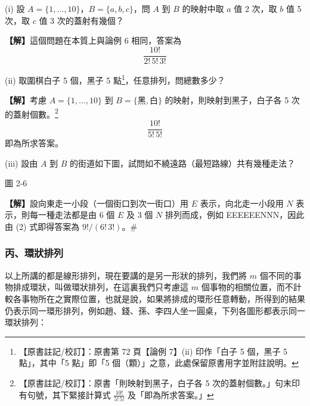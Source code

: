 \begin{discussion}\label{disc:b5-2-7}
(i) 設 $A = \{1, \dots, 10\}$，$B = \{a, b, c\}$，問 $A$ 到 $B$ 的映射中取 $a$ 值 2 次，取 $b$ 值 5 次，取 $c$ 值 3 次的蓋射有幾個？
\par\smallskip\noindent\textbf{【解】}\quad 這個問題在本質上與論例 6 相同，答案為
\[
\frac{10!}{2! \, 5! \, 3!}
\]

\indent(ii) 取圍棋白子 5 個，黑子 5 點\label{note:b5-ch2-p72-go-stones}\footnote{【原書註記/校訂】：原書第 72 頁【論例 7】(ii) 印作「白子 5 個，黑子 5 點」，其中「5 點」即「5 個（顆）」之意，此處保留原書用字並附註說明。}，任意排列，問總數多少？
\par\smallskip\noindent\textbf{【解】}\quad 考慮 $A = \{1, \dots, 10\}$ 到 $B = \{\text{黑}, \text{白}\}$ 的映射，則映射到黑子，白子各 5 次的蓋射個數。\label{note:b5-ch2-p72-surjection-period}\footnote{【原書註記/校訂】：原書「則映射到黑子，白子各 5 次的蓋射個數。」句末印有句號，其下緊接計算式 $\frac{10!}{5!\,5!}$ 及「即為所求答案。」}
\[
\frac{10!}{5! \, 5!}
\]
即為所求答案。

\indent(iii) 設由 $A$ 到 $B$ 的街道如下圖，試問如不繞遠路（最短路線）共有幾種走法？

\begin{center}

\vspace{0.3em}
圖 2-6
\end{center}
\par\smallskip\noindent\textbf{【解】}\quad 設向東走一小段（一個街口到次一街口）用 $E$ 表示，向北走一小段用 $N$ 表示，則每一種走法都是由 6 個 $E$ 及 3 個 $N$ 排列而成，例如 EEEEEENNN，因此由 (2) 式即得答案為 $9! / (6! \, 3!)$。\hfill\#
\end{discussion}

\subsubsection*{丙、環狀排列}

以上所講的都是線形排列，現在要講的是另一形狀的排列，我們將 $m$ 個不同的事物排成環狀，叫做環狀排列，在這裏我們只考慮這 $m$ 個事物的相關位置，而不計較各事物所在之實際位置，也就是說，如果將排成的環形任意轉動，所得到的結果仍表示同一環形排列，例如趙、錢、孫、李四人坐一圓桌，下列各圖形都表示同一環狀排列：

